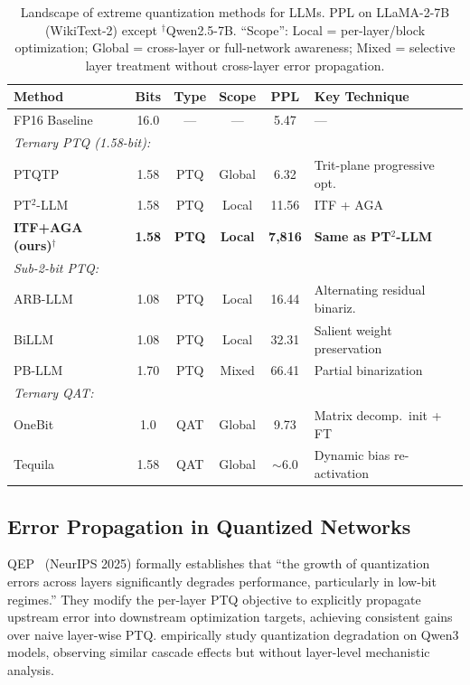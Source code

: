 \documentclass[10pt,a4paper]{article}
\begin{document}
\begin{table}[htbp]
\centering
\caption{Landscape of extreme quantization methods for LLMs. PPL on LLaMA-2-7B (WikiText-2) except $^\dagger$Qwen2.5-7B. ``Scope'': Local = per-layer/block optimization; Global = cross-layer or full-network awareness; Mixed = selective layer treatment without cross-layer error propagation.}
\label{tab:landscape}
\begin{tabular}{lccccl}
\toprule
\textbf{Method} & \textbf{Bits} & \textbf{Type} & \textbf{Scope} & \textbf{PPL} & \textbf{Key Technique} \\
\midrule
FP16 Baseline & 16.0 & --- & --- & 5.47 & --- \\
\midrule
\multicolumn{6}{l}{\textit{Ternary PTQ (1.58-bit):}} \\
PTQTP & 1.58 & PTQ & Global & 6.32 & Trit-plane progressive opt. \\
PT$^2$-LLM & 1.58 & PTQ & Local & 11.56 & ITF + AGA \\
\textbf{ITF+AGA (ours)}$^\dagger$ & \textbf{1.58} & \textbf{PTQ} & \textbf{Local} & \textbf{7,816} & \textbf{Same as PT$^2$-LLM} \\
\midrule
\multicolumn{6}{l}{\textit{Sub-2-bit PTQ:}} \\
ARB-LLM & 1.08 & PTQ & Local & 16.44 & Alternating residual binariz. \\
BiLLM & 1.08 & PTQ & Local & 32.31 & Salient weight preservation \\
PB-LLM & 1.70 & PTQ & Mixed & 66.41 & Partial binarization \\
\midrule
\multicolumn{6}{l}{\textit{Ternary QAT:}} \\
OneBit & 1.0 & QAT & Global & 9.73 & Matrix decomp.\ init + FT \\
Tequila & 1.58 & QAT & Global & $\sim$6.0 & Dynamic bias re-activation \\
\bottomrule
\end{tabular}
\end{table}

\subsection{Error Propagation in Quantized Networks}

QEP~\citep{qep2025} (NeurIPS 2025) formally establishes that ``the growth of quantization errors across layers significantly degrades performance, particularly in low-bit regimes.''
They modify the per-layer PTQ objective to explicitly propagate upstream error into downstream optimization targets, achieving consistent gains over naive layer-wise PTQ.
\citet{qwen3quant2025} empirically study quantization degradation on Qwen3 models, observing similar cascade effects but without layer-level mechanistic analysis.
\end{document}
